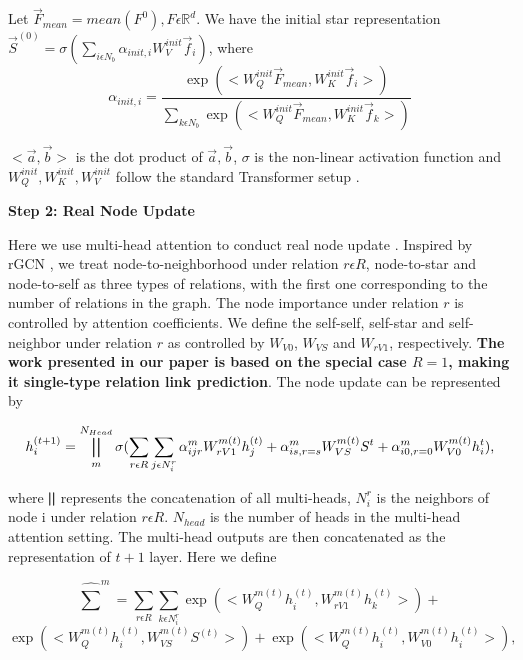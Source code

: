 \documentclass{article}
\begin{document}
Let \(\overrightarrow F_{mean} = mean(F^0), F\epsilon \mathbb{R}^{d}\). We have the initial star representation \(\overrightarrow S^{(0)} = \sigma(\sum\limits_{i\epsilon N_b} \alpha_{init,i}W_V^{init}\overrightarrow f_i)\), where
\begin{equation}
\alpha_{init,i} = \frac{\exp(<W_Q^{init}  \overrightarrow{F}_{mean}, W_K^{init} \overrightarrow{f}_i>)}{\sum\limits_{k\epsilon N_b}{\exp(<W_Q^{init}  \overrightarrow{F}_{mean}, W_K^{init} \overrightarrow{f}_k>)}}
\end{equation}


\(<\overrightarrow a,\overrightarrow b>\) is the dot product of \(\overrightarrow a,\overrightarrow b\), \(\sigma\) is the non-linear activation function and \(W_Q^{init},W_K^{init},W_V^{init}\) follow the standard Transformer setup \cite{vaswani2017attention}. 

\vspace{1mm}

\textbf{Step 2: Real Node Update}

Here we use multi-head attention to conduct real node update \cite{velivckovic2017graph}. Inspired by rGCN \cite{schlichtkrull2018modeling}, we treat node-to-neighborhood under relation \(r\epsilon R\), node-to-star and node-to-self as three types of relations, with the first one corresponding to the number of relations in the graph. The node importance under relation \(r\) is controlled by attention coefficients.
We define the self-self, self-star and self-neighbor under relation \(r\) as controlled by \(W_{V0}\), \(W_{VS}\) and \(W_{rV1}\), respectively. \textbf{The work presented in our paper is based on the special case \(R=1\), making it single-type relation link prediction}. The node update can be represented by

\begin{equation}
h_i^{(t+1)} = \bigparallel_m^{N_{Head}} \sigma(\sum_{r\epsilon R}\sum_{j\epsilon N_i^r} \alpha_{ijr}^m W_{rV1}^{m(t)} h_j^{(t)}+\alpha_{is,r=s}^m W_{VS}^{m(t)}S^t + \alpha_{i0,r=0}^m W_{V0}^{m(t)}h_i^t),
\end{equation}

where \(\bigparallel\) represents the concatenation of all multi-heads, \(N_i^r\) is the neighbors of node i under relation \(r\epsilon R\).
\(N_{head}\) is the number of heads in the multi-head attention setting. The multi-head outputs are then concatenated as the representation of \(t+1\) layer. Here we define


\[
\hat{\sum}^m = \sum_{r\epsilon R}\sum_{k\epsilon N_i^r} \exp(<W_Q^{m(t)}h_i^{(t)},W_{rV1}^{m(t)}h_k^{(t)}>) 
+ 
\]
\begin{equation}
\exp(<W_Q^{m(t)}h_i^{(t)},W_{VS}^{m(t)}S^{(t)}>)
+ \exp(<W_Q^{m(t)}h_i^{(t)},W_{V0}^{m(t)}h_i^{(t)}>),\;
\end{equation}
\end{document}
